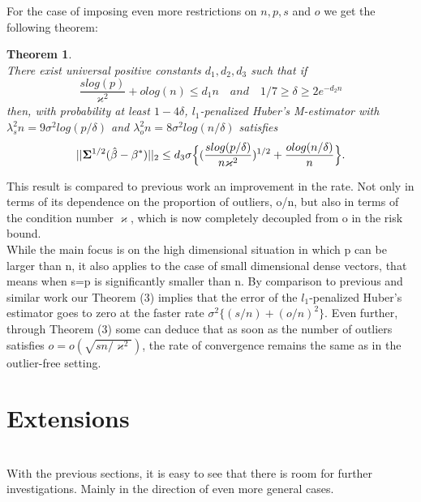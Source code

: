 \documentclass[a4paper,10pt]{article}
\newtheorem{theorem}{Theorem}
\theoremstyle{definition}
\begin{document}
For the case of imposing even more restrictions on $n,p,s$ and $o$ we get the following theorem:

	\begin{theorem}\ \\
		There exist universal positive constants $d_1, d_2, d_3$ such that if
		\begin{equation}
		 	\frac{s log(p)}{\varkappa^2} + o log(n) \leq d_1n \quad and \quad 1/7 \geq \delta \geq 2e^{-d_2n}
		\end{equation}
		then, with probability at least $1-4\delta$, $l_1$-penalized Huber's M-estimator with $\lambda^2_sn = 9\sigma^2 log (p/\delta)$ and $\lambda^2_on = 8\sigma^2 log (n/\delta)$ satisfies
		\begin{equation*}
			||\bold{\Sigma}^{1/2}(\hat{\beta}-\beta^*)||_2 \leq d_3 \sigma \Big\{ (\frac{slog(p/\delta)}{n\varkappa^2})^{1/2} + \frac{olog(n/\delta)}{n} \Big\}.
		\end{equation*}
	\end{theorem}

This result is compared to previous work an improvement in the rate. Not only in terms of its dependence on the proportion of outliers, o/n, but also in terms of the condition number $\varkappa$, which is now completely decoupled from o in the risk bound.\\
While the main focus is on the high dimensional situation in which p can be larger than n, it also applies to the case of small dimensional dense vectors, that means when s=p is significantly smaller than n. By comparison to previous and similar work our Theorem (3) 
implies that the error of the $l_1$-penalized Huber's estimator goes to zero at the faster rate $\sigma^2 \{(s/n)+(o/n)^2\}$. Even further, through Theorem (3)
 some can deduce that as soon as the number of outliers satisfies 
 $o=o(\sqrt{sn/\varkappa^2})$, the rate of convergence remains the same as in the outlier-free setting.

\newpage

\section{Extensions}\ \\
With the previous sections, it is easy to see that there is room for further investigations. Mainly in the direction of even more general cases.
\end{document}
